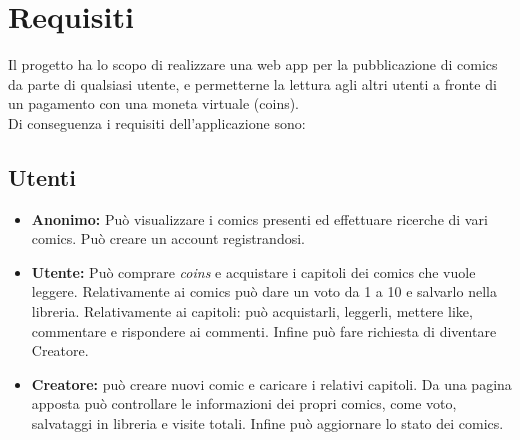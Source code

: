 \section{Requisiti}

Il progetto ha lo scopo di realizzare una web app per la pubblicazione di comics da parte di qualsiasi utente, 
e permetterne la lettura agli altri utenti a fronte di un pagamento con una moneta virtuale (coins).
\\Di conseguenza i requisiti dell’applicazione sono:

\subsection{Utenti}
\begin{itemize}
    \item \textbf{Anonimo:} Può visualizzare i comics presenti ed effettuare ricerche di vari comics. Può creare un account registrandosi.
    \item \textbf{Utente:} Può comprare \textit{coins} e acquistare i capitoli dei comics che vuole leggere. 
    Relativamente ai comics può dare un voto da 1 a 10 e salvarlo nella libreria. 
    Relativamente ai capitoli: può acquistarli, leggerli, mettere like, commentare e rispondere ai commenti. 
    Infine può fare richiesta di diventare Creatore.
    \item \textbf{Creatore:} può creare nuovi comic e caricare i relativi capitoli. Da una pagina apposta può controllare le informazioni dei propri comics, come voto, salvataggi in libreria e visite totali. Infine può aggiornare lo stato dei comics.
\end{itemize}


